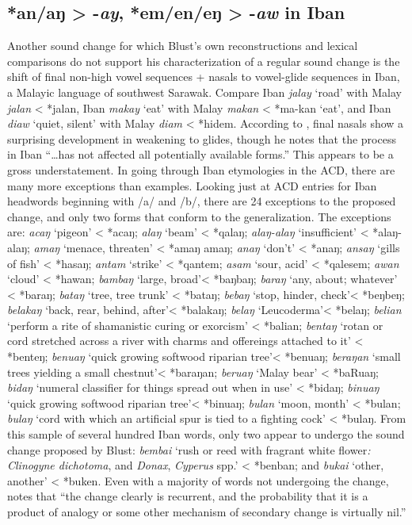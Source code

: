 \documentclass[output=paper]{langscibook}
\begin{document}
\subsection{\label{sec:blevins:3.2}*an/aŋ >  {-\textit{ay}, } {*em/en/eŋ} >  {-\textit{aw} in Iban}}
Another sound change for which Blust’s own reconstructions and lexical comparisons do not support his characterization of a regular sound change is the shift of final non-high vowel sequences + nasals to vowel-glide sequences in Iban, a Malayic language of southwest Sarawak. Compare Iban \textit{jalay} ‘road’ with Malay \textit{jalan} < *jalan, Iban \textit{makay} ‘eat’ with Malay \textit{makan} < *ma-kan ‘eat’, and Iban \textit{diaw} ‘quiet, silent’ with Malay \textit{diam} < *hidem. According to \citet[257--258]{Blust2005}, final nasals show a surprising development in weakening to glides, though he notes that the process in Iban “…has not affected all potentially available forms.” This appears to be a gross understatement. In going through Iban etymologies in the ACD, there are many more exceptions than examples. Looking just at ACD entries for Iban headwords beginning with \mbox{/a/} and \mbox{/b/}, there are 24 exceptions to the proposed change, and only two forms that conform to the generalization. The exceptions are: \textit{acaŋ} ‘pigeon’ < *acaŋ; \textit{alaŋ} ‘beam’ < *qalaŋ; \textit{alaŋ-alaŋ} ‘insufficient’ < *alaŋ-alaŋ; \textit{amaŋ} ‘menace, threaten’ < *amaŋ amaŋ; \textit{anaŋ} ‘don’t’ < *anaŋ; \textit{ansaŋ} ‘gills of fish’ < *hasaŋ; \textit{antam} ‘strike’ < *qantem;  \textit{asam} ‘sour, acid’ < *qalesem; \textit{awan} ‘cloud’ < *hawan; \textit{bambaŋ} ‘large, broad’< *baŋbaŋ;  \textit{baraŋ} ‘any, about; whatever’ < *baraŋ; \textit{bataŋ} ‘tree, tree trunk’ < *bataŋ; \textit{bebaŋ} ‘stop, hinder, check’< *beŋbeŋ; \textit{belakaŋ} ‘back, rear, behind, after’< *balakaŋ; \textit{belaŋ} ‘Leucoderma’< *belaŋ; \textit{belian} ‘perform a rite of shamanistic curing or exorcism’ < *balian; \textit{bentaŋ} ‘rotan or cord stretched across a river with charms and offereings attached to it’ < *benteŋ; \textit{benuaŋ} ‘quick growing softwood riparian tree’< *benuaŋ; \textit{beraŋan} ‘small trees yielding a small chestnut’< *baraŋan; \textit{beruaŋ} ‘Malay bear’ < *baRuaŋ; \textit{bidaŋ} ‘numeral classifier for things spread out when in use’ < *bidaŋ; \textit{binuaŋ} ‘quick growing softwood riparian tree’< *binuaŋ; \textit{bulan} ‘moon, month’ < *bulan; \textit{bulaŋ} ‘cord with which an artificial spur is tied to a fighting cock’ < *bulaŋ. From this sample of several hundred Iban words, only two appear to undergo the sound change proposed by Blust: \textit{bembai} ‘rush or reed with fragrant white flower\textit{: Clinogyne dichotoma}, and \textit{Donax}, \textit{Cyperus} spp.’ < *benban; and \textit{bukai} ‘other, another’ < *buken. Even with a majority of words not undergoing the change, \citet[257]{Blust2005} notes that “the change clearly is recurrent, and the probability that it is a product of analogy or some other mechanism of secondary change is virtually nil.”
\end{document}
